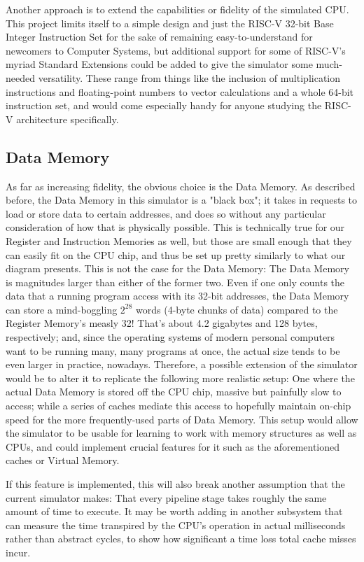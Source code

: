 \documentclass[12pt,twoside]{reedthesis}
\begin{document}
Another approach is to extend the capabilities or fidelity of the simulated CPU. This project limits itself to a simple design and just the RISC-V 32-bit Base Integer Instruction Set  for the sake of remaining easy-to-understand for newcomers to Computer Systems, but additional support for some of RISC-V's myriad Standard Extensions could be added to give the simulator some much-needed versatility. These range from things like the inclusion of multiplication instructions and floating-point numbers to vector calculations and a whole 64-bit instruction set, and would come especially handy for anyone studying the RISC-V architecture specifically.

\subsection{Data Memory}

As far as increasing fidelity, the obvious choice is the Data Memory. As described before, the Data Memory in this simulator is a "black box"; it takes in requests to load or store data to certain addresses, and does so without any particular consideration of how that is physically possible. This is technically true for our Register and Instruction Memories as well, but those are small enough that they can easily fit on the CPU chip, and thus be set up pretty similarly to what our diagram presents. This is not the case for the Data Memory: The Data Memory is magnitudes larger than either of the former two. Even if one only counts the data that a running program access with its 32-bit addresses, the Data Memory can store a mind-boggling $2^28$ words (4-byte chunks of data) compared to the Register Memory's measly 32! That's about 4.2 gigabytes and 128 bytes, respectively; and, since the operating systems of modern personal computers want to be running many, many programs at once, the actual size tends to be even larger in practice, nowadays. Therefore, a possible extension of the simulator would be to alter it to replicate the following more realistic setup: One where the actual Data Memory is stored off the CPU chip, massive but painfully slow to access; while a series of caches mediate this access to hopefully maintain on-chip speed for the more frequently-used parts of Data Memory. This setup would allow the simulator to be usable for learning to work with memory structures as well as CPUs, and could implement crucial features for it such as the aforementioned caches or Virtual Memory.

If this feature is implemented, this will also break another assumption that the current simulator makes: That every pipeline stage takes roughly the same amount of time to execute. It may be worth adding in another subsystem that can measure the time transpired by the CPU's operation in actual milliseconds rather than abstract cycles, to show how significant a time loss total cache misses incur.
\end{document}
